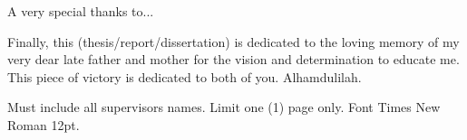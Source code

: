 \begin{acknowledgement}
A very special thanks to...

Finally, this (thesis/report/dissertation) is dedicated to the loving memory of my very dear late father and mother for the vision and determination to educate me. This piece of victory is dedicated to both of you. Alhamdulilah.

Must include all supervisors names. Limit one (1) page only. Font Times New Roman 12pt.
\end{acknowledgement}

